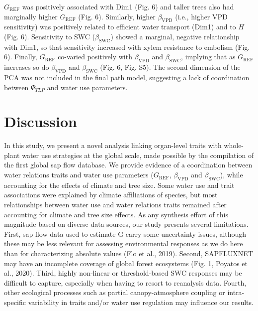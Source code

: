 \documentclass[11pt,twoside]{reedthesis}
\begin{document}
\(G_{\text{REF}}\) was positively associated with Dim1 (Fig. 6) and
taller trees also had marginally higher \(G_{\text{REF}}\) (Fig. 6).
Similarly, higher \(\beta_{\text{VPD}}\) (i.e., higher VPD sensitivity)
was positively related to efficient water transport (Dim1) and to \(H\)
(Fig. 6). Sensitivity to SWC (\(\beta_{\text{SWC}}\)) showed a marginal,
negative relationship with Dim1, so that sensitivity increased with
xylem resistance to embolism (Fig. 6). Finally, \(G_{\text{REF}}\)
co-varied positively with \(\beta_{\text{VPD}}\) and
\(\beta_{\text{SWC}}\), implying that as \(G_{\text{REF}}\) increases so
do \(\beta_{\text{VPD}}\) and \(\beta_{\text{SWC}}\) (Fig. 6, Fig. S5).
The second dimension of the PCA was not included in the final path
model, suggesting a lack of coordination between \(\Psi_{TLP}\) and
water use parameters.\par

\section{Discussion}\label{discussion}

In this study, we present a novel analysis linking organ-level traits
with whole-plant water use strategies at the global scale, made possible
by the compilation of the first global sap flow database. We provide
evidence of a coordination between water relations traits and water use
parameters (\(G_{\text{REF}}\), \(\beta_{\text{VPD}}\) and
\(\beta_{\text{SWC}}\)), while accounting for the effects of climate and
tree size. Some water use and trait associations were explained by
climate affiliations of species, but most relationships between water
use and water relations traits remained after accounting for climate and
tree size effects. As any synthesis effort of this magnitude based on
diverse data sources, our study presents several limitations. First, sap
flow data used to estimate G carry some uncertainty issues, although
these may be less relevant for assessing environmental responses as we
do here than for characterizing absolute values (Flo et al., 2019).
Second, SAPFLUXNET may have an incomplete coverage of global forest
ecosystems (Fig. 1, Poyatos et al., 2020). Third, highly non-linear or
threshold-based SWC responses may be difficult to capture, especially
when having to resort to reanalysis data. Fourth, other ecological
processes such as partial canopy-atmosphere coupling or intra-specific
variability in traits and/or water use regulation may influence our
results.\par
\end{document}
